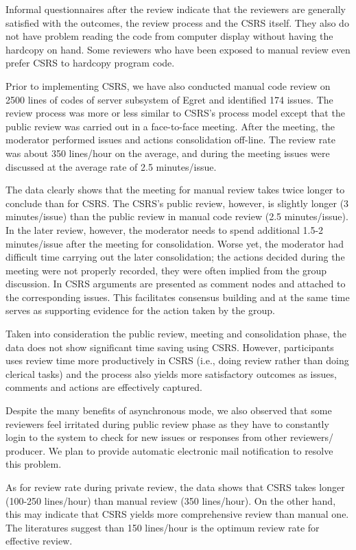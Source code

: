 Informal questionnaires after the review indicate that the
reviewers are generally satisfied with the outcomes, the review
process and the CSRS itself. They also do not have problem reading the
code from computer display without having the hardcopy on hand.
Some reviewers who have been exposed to manual review even prefer
CSRS to hardcopy program code.

Prior to implementing CSRS, we have also conducted manual code
review on 2500 lines of codes of server subsystem of Egret and
identified 174 issues. The review process was more or less
similar to CSRS's process model except that the public review
was carried out in a face-to-face meeting. After the meeting, the
moderator performed issues and actions consolidation off-line.
The review rate was about 350 lines/hour on the average, and during the
meeting issues were discussed at the average rate of 2.5 minutes/issue.

The data clearly shows that the meeting for manual review
takes twice longer to conclude than for CSRS.  The CSRS's public
review, however, is slightly longer (3 minutes/issue) than the
public review in manual code review (2.5 minutes/issue). In the
later review, however, the moderator needs to spend additional
1.5-2 minutes/issue after the meeting for consolidation. Worse
yet, the moderator had difficult time carrying out the later
consolidation; the actions decided during the meeting were not
properly 
recorded, they were often implied from the group discussion. 
In CSRS arguments are presented as comment nodes and attached to
the corresponding issues.  This facilitates consensus building
and at the same time serves as supporting evidence for the action
taken by the group.

Taken into consideration the public review, meeting and consolidation 
phase, the data does not show significant time saving using
CSRS. However, participants uses review time more productively in CSRS
(i.e., doing review rather than doing clerical tasks) and the process
also yields more satisfactory outcomes as issues, comments and actions
are effectively captured.

Despite the many benefits of asynchronous mode, we also observed that
some reviewers feel 
irritated during public review phase as they have to constantly login
to the system to check for new issues or responses from other
reviewers/ producer. We plan to provide automatic electronic mail
notification to resolve this problem.

As for review rate during private review, the data shows that
CSRS takes longer (100-250 lines/hour) than manual review (350
lines/hour).  On the other hand, this may indicate that CSRS
yields more comprehensive review than manual one.
The literatures \cite{Russel91} suggest than 150 lines/hour is the
optimum review rate for effective review.

